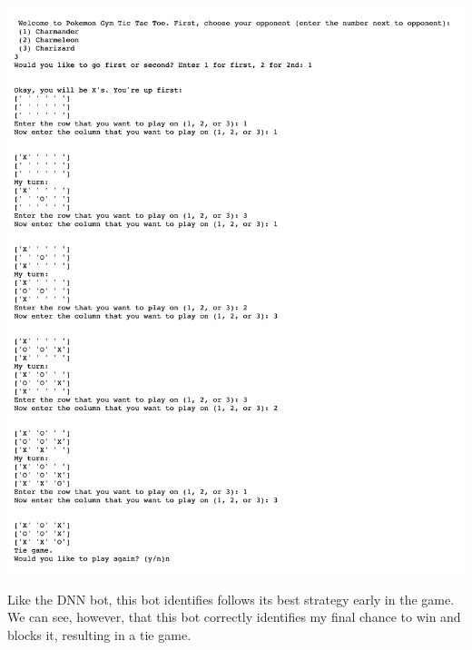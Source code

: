 \includegraphics[scale=.3]{model_3}

Like the DNN bot, this bot identifies follows its best strategy early in the game. We can see, however, that this bot correctly identifies my final chance to win and blocks it, resulting in a tie game. 

